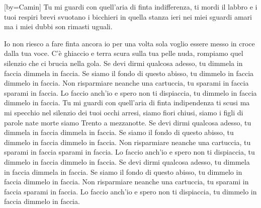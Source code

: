 [by={Camin}]
\chordsoff
\beginverse
Tu mi guardi con quell'aria di finta indifferenza,
ti mordi il labbro 
e i tuoi respiri brevi svuotano i bicchieri 
in quella stanza ieri nei miei sguardi amari 
ma i miei dubbi son rimasti uguali. 

Io non riesco a fare finta ancora 
io per una volta sola 
voglio essere messo in croce dalla tua voce. 
C'è ghiaccio e terra scura sulla tua pelle nuda, 
rompiamo quel silenzio che ci brucia nella gola. 
\endverse
\beginchorus
Se devi dirmi qualcosa adesso, 
tu dimmela in faccia dimmela in faccia. 
Se siamo il fondo di questo abisso, 
tu dimmelo in faccia dimmelo in faccia. 
Non risparmiare neanche una cartuccia, 
tu sparami in faccia sparami in faccia. 
Lo faccio anch'io e spero non ti dispiaccia, 
tu dimmelo in faccia dimmelo in faccia.
\endchorus
\beginverse
Tu mi guardi con quell'aria di finta indipendenza 
ti scusi ma mi specchio nel silenzio dei tuoi occhi arresi, 
siamo fiori chiusi, 
siamo i figli di parole nate morte 
siamo Trento a mezzanotte.
\endverse
\beginchorus
Se devi dirmi qualcosa adesso, 
tu dimmela in faccia dimmela in faccia. 
Se siamo il fondo di questo abisso, 
tu dimmelo in faccia dimmelo in faccia. 
Non risparmiare neanche una cartuccia, 
tu sparami in faccia sparami in faccia. 
Lo faccio anch'io e spero non ti dispiaccia, 
tu dimmelo in faccia dimmelo in faccia.
\endchorus
\beginchorus
Se devi dirmi qualcosa adesso, 
tu dimmela in faccia dimmela in faccia. 
Se siamo il fondo di questo abisso, 
tu dimmelo in faccia dimmelo in faccia. 
Non risparmiare neanche una cartuccia, 
tu sparami in faccia sparami in faccia. 
Lo faccio anch'io e spero non ti dispiaccia, 
tu dimmelo in faccia dimmelo in faccia.
\endchorus
\endsong